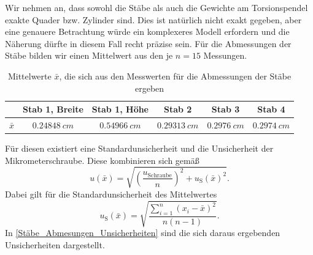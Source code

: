 \documentclass[
	a4paper,
	12pt,
	pagesize,
	ngerman
]{scrartcl}
\begin{document}
	Wir nehmen an, dass sowohl die Stäbe als auch die Gewichte am Torsionspendel exakte Quader bzw. Zylinder sind. Dies ist natürlich nicht exakt gegeben, aber eine genauere Betrachtung würde ein komplexeres Modell erfordern und die Näherung dürfte in diesem Fall recht präzise sein.
	Für die Abmessungen der Stäbe bilden wir einen Mittelwert aus den je $ n=15 $ Messungen.
	

	\begin{table}[tb]
		\centering
		\begin{tabular}{ r | c | c | c | c | c |} 
			& Stab 1, Breite & Stab 1, Höhe  & Stab 2 & Stab 3 &  Stab 4 \\ \hline
			$ \bar{x} $  & $\SI{0,24848}{cm}$ &  $\SI{0,54966}{cm}$ &  $\SI{0,29313}{cm}$ &  $\SI{0,2976}{cm}$ & $\SI{0,2974}{cm}$  \\ \hline
		\end{tabular}
		\caption{Mittelwerte $ \bar{x} $, die sich aus den Messwerten für die Abmessungen der Stäbe ergeben}
		\label{Abmessungen_Stäbe}
	\end{table}
	Für diesen existiert eine Standardunsicherheit und die Unsicherheit der Mikrometerschraube. Diese kombinieren sich gemäß
	\begin{equation*}
		u(\bar{x})=\sqrt{\left( \frac{u_\text{Schraube}}{n}\right) ^2+u_\text{S}(\bar{x})^2}.
	\end{equation*}
	Dabei gilt für die Standardunsicherheit des Mittelwertes
	\begin{equation*}
		u_\text{S}(\bar{x} ) = \sqrt{\frac{\sum_{i=1}^{n} (x_i-\bar{x})^2}{n(n-1)}}.
	\end{equation*}
	In \cref{Stäbe_Abmesungen_Unsicherheiten} sind die sich daraus ergebenden Unsicherheiten dargestellt.
	
\end{document}

